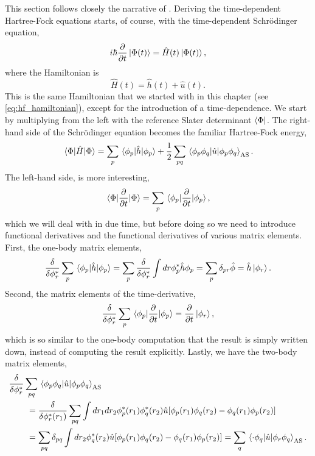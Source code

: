 This section follows closely the narrative of
\citeauthor{hochstuhl2014time} \cite{hochstuhl2014time}.
Deriving the time-dependent Hartree-Fock equations starts,
of course, with the time-dependent Schrödinger equation,
\begin{equation}
    i\hbar \frac{\partial}{\partial t}\ket{\Phi(t)} = \hat{H}(t)\ket{\Phi(t)},
\end{equation}
where the Hamiltonian is 
\begin{equation}
    \hat{H}(t) = \hat{h}(t) + \hat{u}(t).
\end{equation}
This is the same Hamiltonian that we started with in this chapter
(see \autoref{eq:hf_hamiltonian}),
except for the introduction of a 
time-dependence. We start by multiplying from the left with the reference Slater
determinant $\bra{\Phi}$. The right-hand side of the Schrödinger equation becomes
the familiar Hartree-Fock energy,
\begin{equation}
    \mel{\Phi}{\hat{H}}{\Phi} 
    = \sum_p \mel{\phi_p}{\hat{h}}{\phi_p}
    + \frac{1}{2} \sum_{pq}\mel{\phi_p\phi_q}{\hat{u}}{\phi_p\phi_q}_\text{AS}.
\end{equation}
The left-hand side, is more interesting,
\begin{equation}
    \mel{\Phi}{\frac{\partial}{\partial t}}{\Phi} 
    = \sum_p \mel{\phi_p}{\frac{\partial}{\partial t}}{\phi_p},
\end{equation}
which we will deal with in due time, but before doing so we need to introduce 
functional derivatives and the functional derivatives of various matrix elements.
First, the one-body matrix elements,
\begin{equation}
        \frac{\delta}{\delta\phi^*_r} \sum_p \mel{\phi_p}{\hat{h}}{\phi_p}
        = \sum_p \frac{\delta}{\delta \phi^*_r}
            \int dr \phi_p^* \hat{h} \phi_p 
        = \sum_p \delta_{pr} \hat{\phi} = \hat{h}\ket{\phi_r}.
\end{equation}
Second, the matrix elements of the time-derivative,
\begin{equation}
    \frac{\delta}{\delta \phi_r^*} \sum_p\mel{\phi_p}{\frac{\partial}{\partial t}}{\phi_p}
    = \frac{\partial}{\partial t} \ket{\phi_r},
\end{equation}
which is so similar to the one-body computation that the result is simply written down,
instead of computing the result explicitly.
Lastly, we have the two-body matrix elements,
\begin{equation}
    \begin{aligned}
        \frac{\delta}{\delta \phi_r^*} &\sum_{pq}
            \mel{\phi_p\phi_q}{\hat{u}}{\phi_p\phi_q}_\text{AS} \\
        &\ = \frac{\delta}{\delta \phi_r^*(r_1)} \sum_{pq} \int dr_1 dr_2 
            \phi_p^*(r_1) \phi_q^*(r_2)\hat{u}[\phi_p(r_1)\phi_q(r_2) - \phi_q(r_1)\phi_p(r_2)] \\
        &\ = \sum_{pq}\delta_{pq} \int dr_2 \phi_q^*(r_2) 
            \hat{u} [\phi_p(r_1) \phi_q(r_2) - \phi_q(r_1)\phi_p(r_2)]
        = \sum_q \mel{\cdot \phi_q}{\hat{u}}{\phi_r\phi_q}_\text{AS}.
    \end{aligned}
\end{equation}


